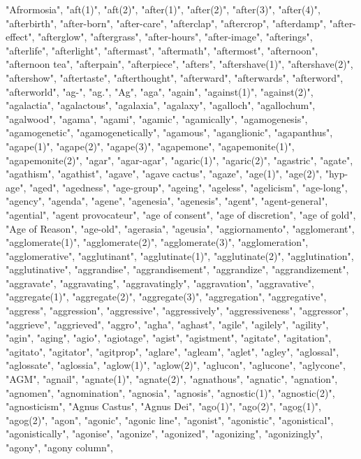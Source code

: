 "Afrormosia",
"aft(1)",
"aft(2)",
"after(1)",
"after(2)",
"after(3)",
"after(4)",
"afterbirth",
"after-born",
"after-care",
"afterclap",
"aftercrop",
"afterdamp",
"after-effect",
"afterglow",
"aftergrass",
"after-hours",
"after-image",
"afterings",
"afterlife",
"afterlight",
"aftermast",
"aftermath",
"aftermost",
"afternoon",
"afternoon tea",
"afterpain",
"afterpiece",
"afters",
"aftershave(1)",
"aftershave(2)",
"aftershow",
"aftertaste",
"afterthought",
"afterward",
"afterwards",
"afterword",
"afterworld",
"ag-",
"ag.",
"Ag",
"aga",
"again",
"against(1)",
"against(2)",
"agalactia",
"agalactous",
"agalaxia",
"agalaxy",
"agalloch",
"agallochum",
"agalwood",
"agama",
"agami",
"agamic",
"agamically",
"agamogenesis",
"agamogenetic",
"agamogenetically",
"agamous",
"aganglionic",
"agapanthus",
"agape(1)",
"agape(2)",
"agape(3)",
"agapemone",
"agapemonite(1)",
"agapemonite(2)",
"agar",
"agar-agar",
"agaric(1)",
"agaric(2)",
"agastric",
"agate",
"agathism",
"agathist",
"agave",
"agave cactus",
"agaze",
"age(1)",
"age(2)",
"hyp-age",
"aged",
"agedness",
"age-group",
"ageing",
"ageless",
"agelicism",
"age-long",
"agency",
"agenda",
"agene",
"agenesia",
"agenesis",
"agent",
"agent-general",
"agential",
"agent provocateur",
"age of consent",
"age of discretion",
"age of gold",
"Age of Reason",
"age-old",
"agerasia",
"ageusia",
"aggiornamento",
"agglomerant",
"agglomerate(1)",
"agglomerate(2)",
"agglomerate(3)",
"agglomeration",
"agglomerative",
"agglutinant",
"agglutinate(1)",
"agglutinate(2)",
"agglutination",
"agglutinative",
"aggrandise",
"aggrandisement",
"aggrandize",
"aggrandizement",
"aggravate",
"aggravating",
"aggravatingly",
"aggravation",
"aggravative",
"aggregate(1)",
"aggregate(2)",
"aggregate(3)",
"aggregation",
"aggregative",
"aggress",
"aggression",
"aggressive",
"aggressively",
"aggressiveness",
"aggressor",
"aggrieve",
"aggrieved",
"aggro",
"agha",
"aghast",
"agile",
"agilely",
"agility",
"agin",
"aging",
"agio",
"agiotage",
"agist",
"agistment",
"agitate",
"agitation",
"agitato",
"agitator",
"agitprop",
"aglare",
"agleam",
"aglet",
"agley",
"aglossal",
"aglossate",
"aglossia",
"aglow(1)",
"aglow(2)",
"aglucon",
"aglucone",
"aglycone",
"AGM",
"agnail",
"agnate(1)",
"agnate(2)",
"agnathous",
"agnatic",
"agnation",
"agnomen",
"agnomination",
"agnosia",
"agnosis",
"agnostic(1)",
"agnostic(2)",
"agnosticism",
"Agnus Castus",
"Agnus Dei",
"ago(1)",
"ago(2)",
"agog(1)",
"agog(2)",
"agon",
"agonic",
"agonic line",
"agonist",
"agonistic",
"agonistical",
"agonistically",
"agonise",
"agonize",
"agonized",
"agonizing",
"agonizingly",
"agony",
"agony column",
